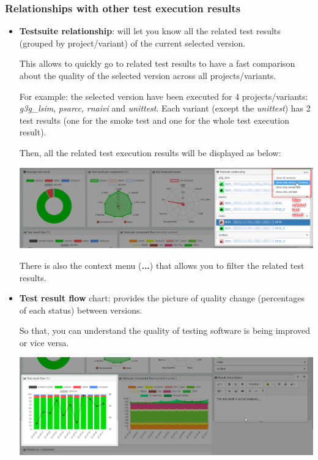 \subsubsection{Relationships with other test execution results}

\begin{itemize}
\item \textbf{Testsuite relationship}: will let you know all the related test 
results (grouped by project/variant) of the current selected version.

This allows to quickly go to related test results to have a fast comparison
about the quality of the selected version across all projects/variants.

For example: the selected version have been executed for 4 
projects/variants: \emph{g3g\_lsim}, \emph{psarcc}, \emph{rnaivi} and 
\emph{unittest}. Each variant (except the \emph{unittest}) has 2 test results 
(one for the smoke test and one for the whole test execution result).

Then, all the related test execution results will be displayed as below:

\includegraphics[width=1\linewidth]
{./pictures/dashboard/testsuite_relationship.png}

There is also the context menu (\textbf{...}) that allows you to filter the 
related test results.

\item \textbf{Test result flow} chart: provides the picture of quality change 
(percentages of each status) between versions. 

So that, you can understand the quality of testing software is being improved 
or vice versa.

\includegraphics[width=1\linewidth]
{./pictures/dashboard/chart_test_result_flow.png}


\end{itemize}
